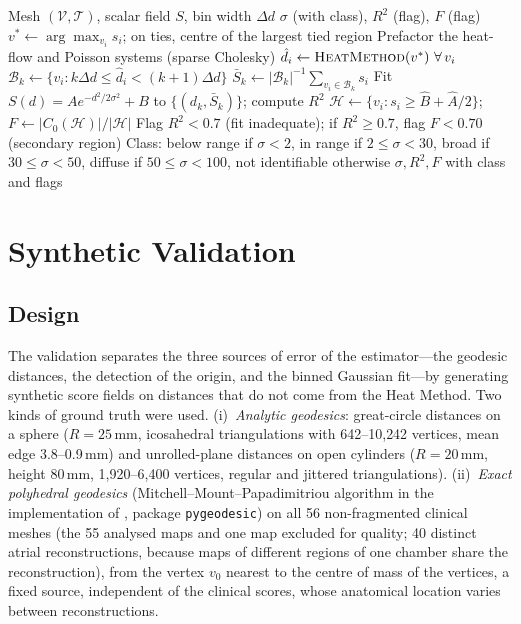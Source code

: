 \documentclass[a4paper,fleqn]{cas-dc}
\begin{document}
\begin{algorithm}[t]
\caption{Geodesic Decay Analysis}\label{alg:pipeline}
\small
\begin{algorithmic}[1]
\Require Mesh $(\mathcal{V}, \mathcal{T})$, scalar field $S$,
  bin width $\Delta d$
\Ensure $\sigma$ (with class), $R^2$ (flag), $F$ (flag)
\State $v^* \gets \arg\max_{v_i} s_i$; on ties, centre of the largest tied region
\State Prefactor the heat-flow and Poisson systems (sparse Cholesky)
\State $\hat{d}_i \gets \Call{HeatMethod}{v^*}\ \forall\, v_i$
  \State $\mathcal{B}_k \gets \{v_i : k\Delta d
    \le \hat{d}_i < (k{+}1)\Delta d\}$
    $\bar{S}_k \gets |\mathcal{B}_k|^{-1}
      \sum_{v_i \in \mathcal{B}_k} s_i$
  \EndIf
\EndFor
\State Fit $S(d) = A e^{-d^2/2\sigma^2} + B$
  to $\{(d_k, \bar{S}_k)\}$; compute $R^2$
\State $\mathcal{H} \gets \{v_i : s_i \ge \hat B + \hat A/2\}$;
  $F \gets |C_0(\mathcal{H})| / |\mathcal{H}|$
\State Flag $R^2 < 0.7$ (fit inadequate); if $R^2 \ge 0.7$, flag $F < 0.70$ (secondary region)
\State Class: below range if $\sigma < 2$, in range if $2 \le \sigma < 30$,
  broad if $30 \le \sigma < 50$, diffuse if $50 \le \sigma < 100$, not identifiable otherwise
\State \Return $\sigma, R^2, F$ with class and flags
\end{algorithmic}
\end{algorithm}

\section{Synthetic Validation}\label{sec:validation}

\subsection{Design}\label{sec:validation_design}
The validation separates the three sources of error of the
estimator---the geodesic distances, the detection of the origin, and the
binned Gaussian fit---by generating synthetic score fields on distances
that do not come from the Heat Method.  Two kinds of ground truth were
used.  (i)~\emph{Analytic geodesics}: great-circle distances on a
sphere ($R = 25$\,mm, icosahedral triangulations with 642--10{,}242
vertices, mean edge 3.8--0.9\,mm) and unrolled-plane distances on open
cylinders ($R = 20$\,mm, height 80\,mm, 1{,}920--6{,}400 vertices,
regular and jittered triangulations).  (ii)~\emph{Exact polyhedral
geodesics} (Mitchell--Mount--Papadimitriou algorithm in the
implementation of \citet{surazhsky2005}, package \texttt{pygeodesic})
on all 56 non-fragmented clinical meshes (the 55 analysed maps and one
map excluded for quality; 40 distinct atrial reconstructions, because
maps of different regions of one chamber share the reconstruction),
from the vertex $v_0$ nearest to the centre of mass of the vertices, a
fixed source, independent of the clinical scores, whose anatomical
location varies between reconstructions.
\end{document}
